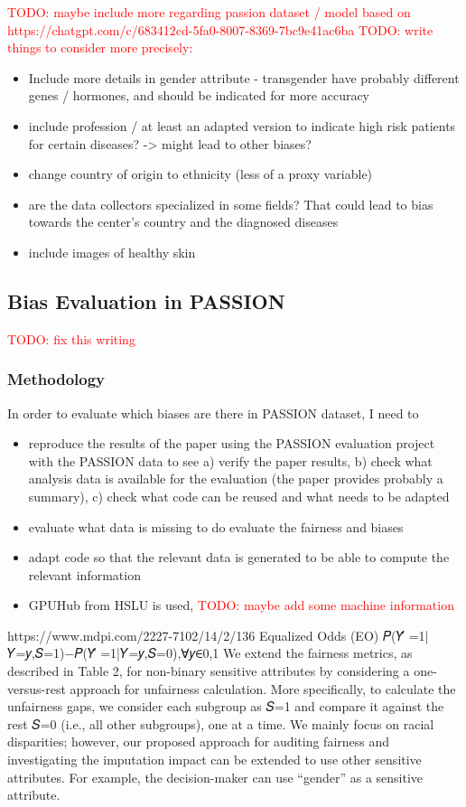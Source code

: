 \documentclass[12pt, a4paper, oneside]{book}   	%
\renewcommand{\todo}[1]{\textcolor{red}{TODO: #1}}
\renewcommand{\paragraph}[1]{%
	\subsubsection*{#1}%
}
\newcommand{\rawcitationusedstart}{\color{violet}}
\begin{document}
			\todo{maybe include more regarding passion dataset / model based on https://chatgpt.com/c/683412cd-5fa0-8007-8369-7bc9e41ac6ba}
			\todo{write things to consider more precisely:}
			\begin{itemize}
				\item Include more details in gender attribute - transgender have probably different genes / hormones, and should be indicated for more accuracy
				\item include profession / at least an adapted version to indicate high risk patients for certain diseases? -> might lead to other biases?
				\item change country of origin to ethnicity (less of a proxy variable)
				\item are the data collectors specialized in some fields? That could lead to bias towards the center's country and the diagnosed diseases
				\item include images of healthy skin
			\end{itemize}
		
		\subsection{Bias Evaluation in PASSION}
		\todo{fix this writing}
		\paragraph{Methodology}
		In order to evaluate which biases are there in PASSION dataset, I need to
		\begin{itemize}
			\item reproduce the results of the paper using the PASSION evaluation project with the PASSION data to see a) verify the paper results, b) check what analysis data is available for the evaluation (the paper provides probably a summary), c) check what code can be reused and what needs to be adapted
			\item evaluate what data is missing to do evaluate the fairness and biases
			\item adapt code so that the relevant data is generated to be able to compute the relevant information
			\item GPUHub from HSLU is used, \todo{maybe add some machine information}
		\end{itemize}
		
		
		
		
		
		\rawcitationusedstart
		https://www.mdpi.com/2227-7102/14/2/136
		Equalized Odds (EO)	 𝑃(𝑌̂ =1|𝑌=𝑦,𝑆=1)−𝑃(𝑌̂ =1|𝑌=𝑦,𝑆=0),∀𝑦∈{0,1}
		We extend the fairness metrics, as described in Table 2, for non-binary sensitive attributes by considering a one-versus-rest approach for unfairness calculation. More specifically, to calculate the unfairness gaps, we consider each subgroup as 𝑆=1
		and compare it against the rest 𝑆=0
		(i.e., all other subgroups), one at a time. We mainly focus on racial disparities; however, our proposed approach for auditing fairness and investigating the imputation impact can be extended to use other sensitive attributes. For example, the decision-maker can use “gender” as a sensitive attribute.
		
\end{document}
